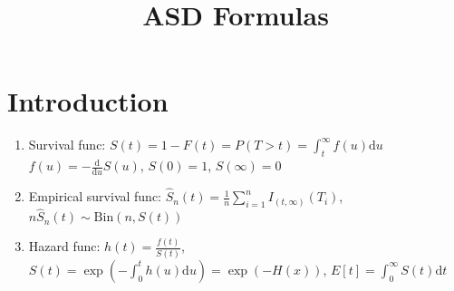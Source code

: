 \documentclass[11pt,a4paper]{article}
\title{ASD Formulas}
\begin{document}

\section*{Introduction}
\begin{enumerate}

\item Survival func: $S(t) = 1 - F(t) = P(T>t) = \int_t^\infty f(u) \mathrm{d} u$ \\
$f(u) = - \frac{\mathrm{d}}{\mathrm{d}u} S(u)$, $S(0) = 1$, $S(\infty) = 0$

\item Empirical survival func: $\displaystyle \hat{S}_n (t) = \frac{1}{n} \sum_{i=1}^n I_{(t, \infty)} \left( T_i \right)$, $n \hat{S}_n (t) \sim \text{Bin} \left( n, S(t) \right)$

\item Hazard func: $\displaystyle h(t) = \frac{f(t)}{S(t)}$, $\displaystyle S(t) = \exp \left( - \int_0^t h(u) \mathrm{d} u \right) = \exp \left( - H(x) \right)$, $\displaystyle E[t] = \int_0^\infty S(t) \mathrm{d}t$

\end{enumerate}
\end{document}
